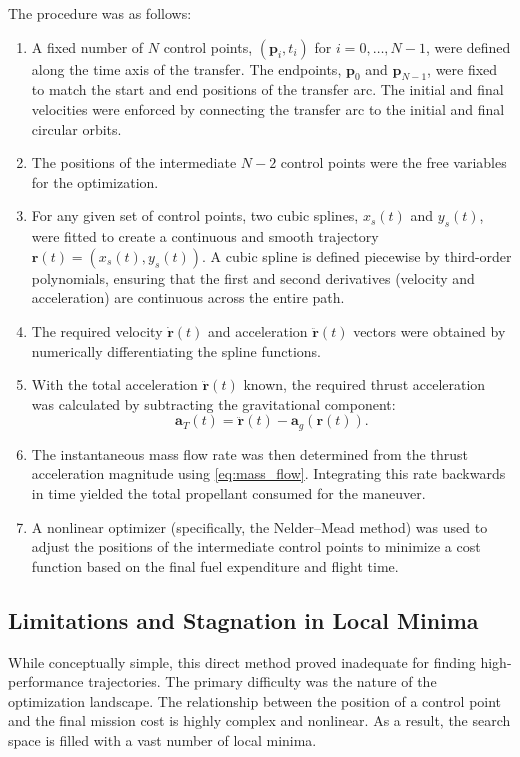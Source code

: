\documentclass[journal, a4paper]{IEEEtran}
\begin{document}
The procedure was as follows:
{
\renewcommand{\labelenumi}{\arabic{enumi}.}
\begin{enumerate}
    \item A fixed number of $N$ control points, $(\mathbf{p}_i, t_i)$ for $i=0, \dots, N-1$, were defined along the time axis of the transfer. The endpoints, $\mathbf{p}_0$ and $\mathbf{p}_{N-1}$, were fixed to match the start and end positions of the transfer arc. The initial and final velocities were enforced by connecting the transfer arc to the initial and final circular orbits.
    \item The positions of the intermediate $N-2$ control points were the free variables for the optimization.
    \item For any given set of control points, two cubic splines, $x_s(t)$ and $y_s(t)$, were fitted to create a continuous and smooth trajectory $\mathbf{r}(t) = (x_s(t), y_s(t))$. A cubic spline is defined piecewise by third-order polynomials, ensuring that the first and second derivatives (velocity and acceleration) are continuous across the entire path.
    \item The required velocity $\dot{\mathbf{r}}(t)$ and acceleration $\ddot{\mathbf{r}}(t)$ vectors were obtained by numerically differentiating the spline functions.
    \item With the total acceleration $\ddot{\mathbf{r}}(t)$ known, the required thrust acceleration was calculated by subtracting the gravitational component:
    \begin{equation}
        \mathbf{a}_T(t) = \ddot{\mathbf{r}}(t) - \mathbf{a}_g(\mathbf{r}(t)).
    \end{equation}
    \item The instantaneous mass flow rate was then determined from the thrust acceleration magnitude using \eqref{eq:mass_flow}. Integrating this rate backwards in time yielded the total propellant consumed for the maneuver.
    \item A nonlinear optimizer (specifically, the Nelder--Mead method) was used to adjust the positions of the intermediate control points to minimize a cost function based on the final fuel expenditure and flight time.
\end{enumerate}
}

\subsection*{Limitations and Stagnation in Local Minima}
While conceptually simple, this direct method proved inadequate for finding high-performance trajectories. The primary difficulty was the nature of the optimization landscape. The relationship between the position of a control point and the final mission cost is highly complex and nonlinear. As a result, the search space is filled with a vast number of local minima.
\end{document}
